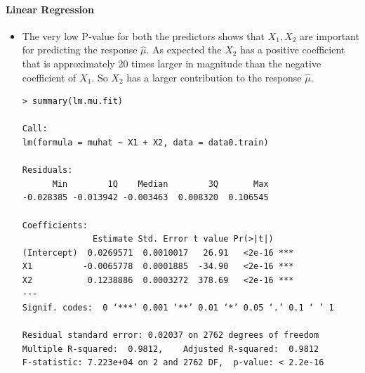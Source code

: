 \documentclass[twoside,12pt]{article}
\begin{document}
\paragraph{Linear Regression}
\begin{itemize}
\item
The very low P-value for both the predictors shows that $X_1,X_2$ are important for predicting the response $\hat{\mu}$. As expected the $X_2$ has a positive coefficient that is approximately 20 times larger in magnitude than the  negative coefficient of $X_1$. So $X_2$ has a larger contribution to the response $\hat{\mu}$.
\begin{verbatim}
> summary(lm.mu.fit)

Call:
lm(formula = muhat ~ X1 + X2, data = data0.train)

Residuals:
      Min        1Q    Median        3Q       Max 
-0.028385 -0.013942 -0.003463  0.008320  0.106545 

Coefficients:
              Estimate Std. Error t value Pr(>|t|)    
(Intercept)  0.0269571  0.0010017   26.91   <2e-16 ***
X1          -0.0065778  0.0001885  -34.90   <2e-16 ***
X2           0.1238886  0.0003272  378.69   <2e-16 ***
---
Signif. codes:  0 ‘***’ 0.001 ‘**’ 0.01 ‘*’ 0.05 ‘.’ 0.1 ‘ ’ 1

Residual standard error: 0.02037 on 2762 degrees of freedom
Multiple R-squared:  0.9812,    Adjusted R-squared:  0.9812 
F-statistic: 7.223e+04 on 2 and 2762 DF,  p-value: < 2.2e-16
\end{verbatim}


\end{itemize}
\end{document}
